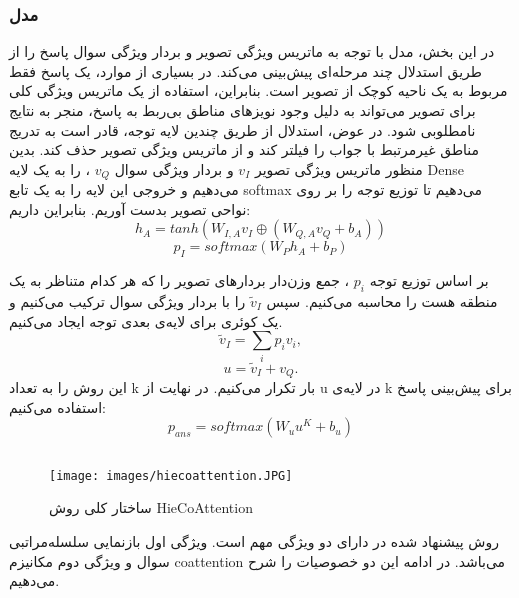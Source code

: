 {{		\subsubsection{مدل }
		{
			در این بخش، مدل
			 با توجه به ماتریس ویژگی تصویر و بردار ویژگی سوال پاسخ را از طریق استدلال چند مرحله‌ای پیش‌بینی می‌کند. در بسیاری  از موارد، یک پاسخ فقط مربوط به یک ناحیه کوچک از تصویر است. بنابراین، استفاده از یک ماتریس ویژگی کلی  برای تصویر می‌تواند به دلیل وجود نویزهای مناطق بی‌ربط  به پاسخ، منجر به نتایج نامطلوبی شود. در عوض، استدلال از طریق چندین لایه توجه، قادر است به تدریج مناطق غیرمرتبط با جواب را فیلتر کند و از ماتریس ویژگی تصویر حذف کند. بدین منظور ماتریس ویژگی تصویر
		 $v_I$
	    و بردار ویژگی سوال
	    $v_Q$
	    ، را به یک لایه Dense می‌دهیم و خروجی این لایه را به یک تابع softmax می‌دهیم تا توزیع توجه را بر روی نواحی تصویر بدست آوریم. بنابراین داریم:
	    \begin{equation}
	    	h_A = tanh (W_{I,A} v_I \oplus (W_{Q,A}v_Q + b_A))
	    \end{equation}
	    \begin{equation}
	    	p_I = softmax(W_Ph_A + b_P)
	    \end{equation}
	    
	    بر اساس توزیع توجه
	     $p_i$
	     ، جمع وزن‌دار بردارهای تصویر را که هر کدام متناظر به یک منطقه هست را محاسبه می‌کنیم. سپس
	     $\tilde{v}_I$
	      را با بردار ویژگی سوال ترکیب می‌کنیم و یک کوئری برای لایه‌ی بعدی توجه ایجاد می‌کنیم.	    
	     \begin{equation}
	      	\tilde{v}_I =\sum_i p_iv_i,
	     \end{equation}
	     \begin{equation}
	        u =\tilde{v}_I + v_Q.
	     \end{equation}
	      این روش را به تعداد k بار تکرار می‌کنیم. در نهایت از u در لایه‌ی k برای پیش‌بینی پاسخ استفاده می‌کنیم:
	     \begin{equation}
	     	p_{ans} =softmax(W_uu^K + b_u)
	     \end{equation}
	     
		}
	}

	\subsection{ \cite{lu2016hierarchical}}
	{
		\begin{figure}
			\centering
			\texttt{[image: images/hiecoattention.JPG]}
			\caption{ساختار کلی روش HieCoAttention}
			\label{fig:7}
		\end{figure}
		روش پیشنهاد شده در 
		\cite{lu2016hierarchical}
		دارای دو ویژگی مهم است. ویژگی اول بازنمایی سلسله‌مراتبی سوال و ویژگی دوم مکانیزم coattention می‌باشد. در ادامه این دو خصوصیات را شرح می‌دهیم.
		
}}

